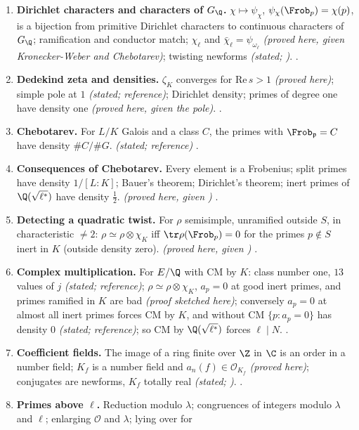 \begin{enumerate}[label=\textbf{\thechapter.\arabic*}]
conventions \emph{(stated; reference)}. .
\item \textbf{Dirichlet characters and characters of $G_\Q$.} $\chi\mapsto\psi_\chi$, $\psi_\chi(\Frob_p)=\chi(p)$, is a bijection from primitive Dirichlet characters to
continuous characters of $G_\Q$; ramification and conductor match; $\chi_\ell$ and $\bar\chi_\ell=\psi_{\omega_\ell}$ \emph{(proved here, given Kronecker-Weber and Chebotarev)};
twisting newforms \emph{(stated; )}. .
\item \textbf{Dedekind zeta and densities.} $\zeta_K$ converges for $\mathrm{Re}\,s>1$ \emph{(proved here)}; simple pole at $1$ \emph{(stated; reference)}; Dirichlet
density; primes of degree one have density one \emph{(proved here, given the pole)}. .
\item \textbf{Chebotarev.} For $L/K$ Galois and a class $C$, the primes with $\Frob_{\mathfrak p}=C$ have density $\#C/\#G$. \emph{(stated; reference)}
.
\item \textbf{Consequences of Chebotarev.} Every element is a Frobenius; split primes have density $1/[L:K]$; Bauer's theorem; Dirichlet's theorem; inert primes
of $\Q(\sqrt{\ell^*})$ have density $\frac12$. \emph{(proved here, given )} .
\item \textbf{Detecting a quadratic twist.} For $\rho$ semisimple, unramified outside $S$, in characteristic $\ne2$: $\rho\simeq\rho\otimes\chi_K$ iff $\tr\rho(\Frob_p)=0$ for
the primes $p\notin S$ inert in $K$ (outside density zero). \emph{(proved here, given )} .
\item \textbf{Complex multiplication.} For $E/\Q$ with CM by $K$: class number one, $13$ values of $j$ \emph{(stated; reference)}; $\rho\simeq\rho\otimes\chi_K$, $a_p=0$ at good
inert primes, and primes ramified in $K$ are bad \emph{(proof sketched here)}; conversely $a_p=0$ at almost all inert primes forces CM by $K$, and without CM
$\{p:a_p=0\}$ has density $0$ \emph{(stated; reference)}; so CM by $\Q(\sqrt{\ell^*})$ forces $\ell\mid N$. .
\item \textbf{Coefficient fields.} The image of a ring finite over $\Z$ in $\C$ is an order in a number field; $K_f$ is a number field and $a_n(f)\in\mathcal O_{K_f}$
\emph{(proved here)}; conjugates are newforms, $K_f$ totally real \emph{(stated; )}. .
\item \textbf{Primes above $\ell$.} Reduction modulo $\lambda$; congruences of integers modulo $\lambda$ and $\ell$; enlarging $\mathcal O$ and $\lambda$; lying over for

\end{enumerate}
